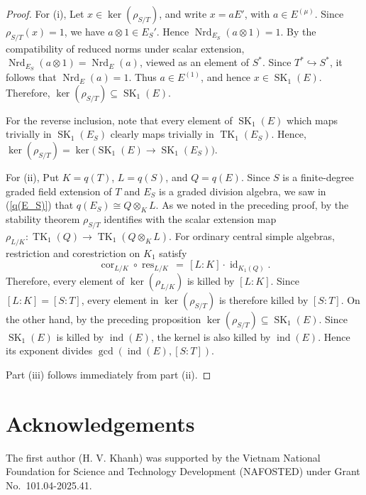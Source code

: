 \documentclass[11pt]{article}
\numberwithin{equation}{section}
\theoremstyle{plain}
\theoremstyle{remark}
\newcommand{\opn}{\operatorname}
\begin{document}
\begin{proof}
For (i), 
Let $x\in\ker(\rho_{S/T})$, and write $x=aE'$, with $a\in E^{(\mu)}$.  Since $\rho_{S/T}(x)=1$, we have 
$a\otimes1\in E_S'$.  Hence $\operatorname{Nrd}_{E_S}(a\otimes1)=1$.  By the compatibility of reduced norms 
under scalar extension, $\operatorname{Nrd}_{E_S}(a\otimes1)=\operatorname{Nrd}_E(a)$, viewed as 
an element of $S^*$.  Since $T^*\hookrightarrow S^*$, it follows that $\operatorname{Nrd}_E(a)=1$.  Thus 
$a\in E^{(1)}$, and hence $x\in\operatorname{SK}_1(E)$.  Therefore, 
$\ker(\rho_{S/T})\subseteq \operatorname{SK}_1(E)$.

For the reverse inclusion, note that every element of $\operatorname{SK}_1(E)$ which maps trivially in 
$\operatorname{SK}_1(E_S)$ clearly maps trivially in $\operatorname{TK}_1(E_S)$.  Hence,
$
        \ker(\rho_{S/T})
        =
        \ker\bigl(\operatorname{SK}_1(E)\to \operatorname{SK}_1(E_S)\bigr).
$

For (ii),
Put $K=q(T)$, $L=q(S)$, and $Q=q(E)$.  Since $S$ is  a finite-degree  graded field extension of $T$
and $E_S$ is a graded division algebra, 
we saw in (\ref{q(E_S)}) that
$
        q(E_S)\cong Q\otimes_K L.
$
As we noted in the preceding proof, by the stability theorem  $\rho_{S/T}$ identifies with the  scalar extension map 
$\rho_{L/K}\colon\opn{TK}_1(Q)\to \opn{TK}_1(Q\otimes_K L)$.  For ordinary central simple algebras, restriction 
and corestriction on $K_1$ 
satisfy
$$
        \opn{cor}_{L/K}\circ\opn{res}_{L/K}
        \,=\,
        [L:K]\cdot\opn{id}_{K_1(Q)}.
$$
Therefore, every element of $\ker(\rho_{L/K})$ is killed by $[L:K]$.
Since $[L:K]=[S:T]$, every element in $\ker(\rho_{S/T})$ is therefore killed by $[S:T]$.  On the other hand, by the 
preceding 
proposition
$\ker(\rho_{S/T})\subseteq\opn{SK}_1(E)$.  Since $\operatorname{SK}_1(E)$ is killed by $\operatorname{ind}(E)$, 
the kernel is also killed by $\operatorname{ind}(E)$.  Hence its exponent divides $\gcd(\operatorname{ind}(E),[S:T])$. 

Part (iii) follows  immediately from part (ii). 
\end{proof}

\section*{Acknowledgements}
The first author (H. V. Khanh) was supported by the Vietnam National Foundation for Science and Technology Development (NAFOSTED) under Grant No.~101.04-2025.41.
\end{document}
